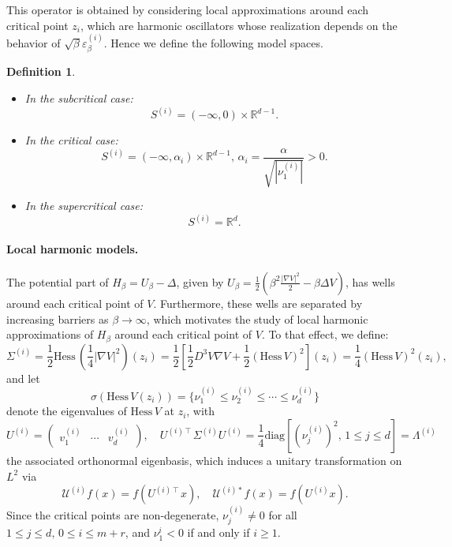 \documentclass[10pt]{article}
\newcommand{\R}{\mathbb{R}}
\newcommand{\Hess}{\mathrm{Hess}\,}
\newcommand{\1}{\mathbbm 1}
\newtheorem{definition}{Definition}
\begin{document}
    This operator is obtained by considering local approximations around each critical point $z_i$, which are harmonic oscillators whose realization depends on the behavior of $\sqrt\beta\varepsilon_\beta^{(i)}$. Hence we define the following model spaces.
    \begin{definition}
        \label{def:model_spaces}
        \begin{itemize} 
            \item In the subcritical case: $$S^{(i)} = (-\infty,0)\times \R^{d-1}.$$
            \item In the critical case: $$ S^{(i)} = (-\infty,\alpha_i)\times \R^{d-1},\,\alpha_i = \frac{\alpha}{\sqrt{|\nu_1^{(i)}|}} >0.$$
            \item In the supercritical case: $$S^{(i)} = \R^d.$$
        \end{itemize}
    \end{definition}

    \paragraph{Local harmonic models.\newline}
    The potential part of $H_\beta = U_\beta - \Delta$, given by $U_\beta=\frac12\left(\beta^2\frac{|\nabla V|^2}2-\beta\Delta V\right)$, has wells around each critical point of $V$. Furthermore, these wells are separated by increasing barriers as $\beta\to\infty$, which motivates the study of local harmonic approximations of $H_\beta$ around each critical point of $V$.
    To that effect, we define:
    \[\Sigma^{(i)} = \frac12\Hess (\frac14|\nabla V|^2)(z_i)  = \frac12\left[\frac12 D^3 V \nabla V + \frac12 \left( \Hess V\right)^2 \right](z_i) = \frac14 \left(\Hess V\right)^2(z_i),\]
    and let
    \[\sigma(\Hess V(z_i)) = \{\nu_1^{(i)} \leq \nu_2^{(i)} \leq \dotsm \leq \nu_d^{(i)}\}\]
    denote the eigenvalues of $\Hess V$ at $z_i$, with
    \[U^{(i)} =\begin{pmatrix}v_1^{(i)}&\dotsm&v_d^{(i)}\end{pmatrix},\quad U^{(i)\intercal} \Sigma^{(i)} U^{(i)} = \frac14\mathrm{diag}\left[\left(\nu_j^{(i)}\right)^2,\,1\leq j\leq d\right] = \Lambda^{(i)}\]
    the associated orthonormal eigenbasis, which induces a unitary transformation on $L^2$ via
    $$ \mathcal U^{(i)} f(x) = f\left( U^{(i)\intercal}x\right),\quad \mathcal U^{(i)*} f(x) = f\left( U^{(i)}x\right).$$
    Since the critical points are non-degenerate, $\nu_j^{(i)} \neq 0$ for all $1\leq j\leq d,\,0\leq i \leq m+r$, and $\nu_1^{i} < 0$ if and only if $i\geq 1$.
    
\end{document}
